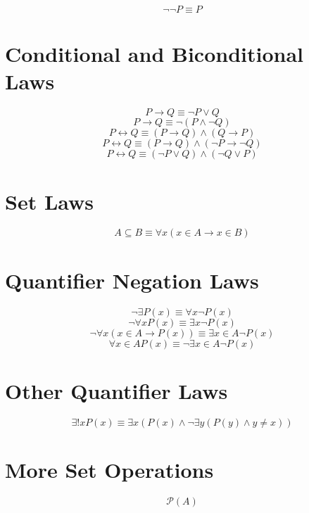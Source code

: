 \documentclass[11pt]{article}
\newcommand{\then}{\rightarrow}
\newcommand{\bicond}{\leftrightarrow}
\newcommand{\powerset}[1]{\mathscr{P}(#1)}
\begin{document}
$$\neg \neg P \equiv P$$

\section{Conditional and Biconditional Laws}

$$P \then Q \equiv \neg P \vee Q$$
$$P \then Q \equiv \neg (P \wedge \neg Q)$$
$$P \bicond Q \equiv (P \then Q) \wedge (Q \then P)$$
$$P \bicond Q \equiv (P \then Q) \wedge (\neg P \then \neg Q)$$
$$P \bicond Q \equiv (\neg P \vee Q) \wedge (\neg Q \vee P)$$

\section{Set Laws}
$$A \subseteq B \equiv \forall x (x \in A \then x \in B)$$

\section{Quantifier Negation Laws}

$$\neg \exists P(x) \equiv \forall x \neg P(x)$$
$$\neg \forall x P(x) \equiv \exists x \neg P(x)$$
$$\neg \forall x (x \in A \then P(x)) \equiv \exists x \in A \neg P(x)$$
$$\forall x \in A P(x) \equiv \neg \exists x \in A \neg P(x)$$

\section{Other Quantifier Laws}

$$\exists! x P(x) \equiv \exists x (P(x) \wedge \neg \exists y (P(y) \wedge y \neq x))$$

\section{More Set Operations}

$$\powerset{A}$$
\end{document}
